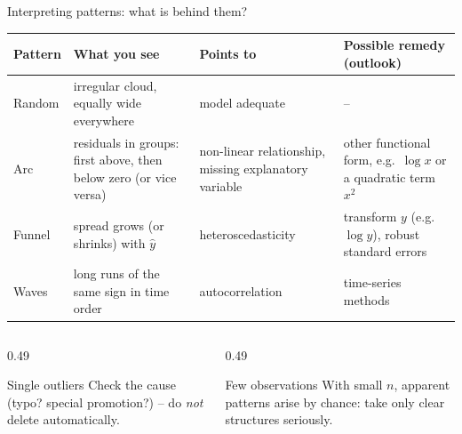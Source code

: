 \documentclass[aspectratio=169,11pt]{beamer}
\begin{document}
\begin{frame}{Interpreting patterns: what is behind them?}
  \footnotesize
  \begin{center}
    \renewcommand{\arraystretch}{1.12}
    \begin{tabular}{@{}>{\raggedright\arraybackslash}p{1.6cm}
                       >{\raggedright\arraybackslash}p{4.0cm}
                       >{\raggedright\arraybackslash}p{3.6cm}
                       >{\raggedright\arraybackslash}p{4.3cm}@{}}
      \toprule
      \textbf{Pattern} & \textbf{What you see} & \textbf{Points to} & \textbf{Possible remedy (outlook)} \\
      \midrule
      Random & irregular cloud, equally wide everywhere
        & model adequate & -- \\
      Arc & residuals in groups: first above, then below zero (or vice versa)
        & non-linear relationship, missing explanatory variable
        & other functional form, e.g.\ $\log x$ or a quadratic term $x^2$ \\
      Funnel & spread grows (or shrinks) with $\hat{y}$
        & heteroscedasticity & transform $y$ (e.g.\ $\log y$), robust
          standard errors \\
      Waves & long runs of the same sign in time order
        & autocorrelation & time-series methods \\
      \bottomrule
    \end{tabular}
  \end{center}

  \begin{columns}[T]
    \begin{column}{0.49\textwidth}
      \begin{alertblock}{Single outliers}
        Check the cause (typo? special promotion?) -- do \emph{not} delete
        automatically.
      \end{alertblock}
    \end{column}
    \begin{column}{0.49\textwidth}
      \begin{exampleblock}{Few observations}
        With small $n$, apparent patterns arise by chance: take only clear
        structures seriously.
      \end{exampleblock}
    \end{column}
  \end{columns}
\end{frame}
\end{document}
